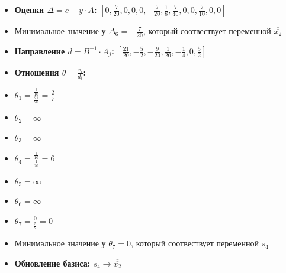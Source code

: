 \begin{itemize}
\begin{itemize}
$[- \frac{1}{8}, - \frac{7}{40}, 0, 0, \frac{7}{10}, 0, 0]$
\item \textbf{Оценки $\Delta = c - y \cdot A$:}
$[0, \frac{7}{20}, 0, 0, 0, - \frac{7}{20}, \frac{1}{8}, \frac{7}{40}, 0, 0, \frac{7}{10}, 0, 0]$
\item Минимальное значение у  $\Delta_{6} = - \frac{7}{20}$, который соотвествует переменной $\overline{\overline{x_2}}$
\item \textbf{Направление $d = B^{-1} \cdot A_j$:}
$[\frac{21}{20}, - \frac{5}{2}, - \frac{9}{20}, \frac{1}{20}, - \frac{1}{4}, 0, \frac{5}{2}]$
\item \textbf{Отношения $\theta = \frac{x_i}{d_i}$:}
\item $\theta_{1} = \frac{\frac{3}{10}}{\frac{21}{20}} = \frac{2}{7}$
\item $\theta_{2} = \infty$
\item $\theta_{3} = \infty$
\item $\theta_{4} = \frac{\frac{3}{10}}{\frac{1}{20}} = 6$
\item $\theta_{5} = \infty$
\item $\theta_{6} = \infty$
\item $\theta_{7} = \frac{0}{\frac{5}{2}} = 0$
\item Минимальное значение у  $\theta_{7} = 0$, который соотвествует переменной $s_4$
\item \textbf{Обновление базиса: $s_4 \rightarrow \overline{\overline{x_2}}$}
\end{itemize}
\newpage

\end{itemize}
